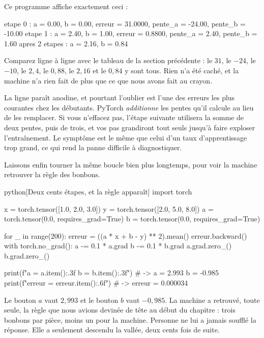 Ce programme affiche exactement ceci :

\begin{sortie}
etape 0 : a = 0.00, b = 0.00, erreur = 31.0000, pente_a = -24.00, pente_b = -10.00
etape 1 : a = 2.40, b = 1.00, erreur = 0.8800, pente_a = 2.40, pente_b = 1.60
apres 2 etapes : a = 2.16, b = 0.84
\end{sortie}

Comparez ligne à ligne avec le tableau de la section précédente : le $31$,
le $-24$, le $-10$, le $2{,}4$, le $0{,}88$, le $2{,}16$ et le $0{,}84$ y
sont tous. Rien n'a été caché, et la machine n'a rien fait de plus que ce
que nous avons fait au crayon.

\begin{piege}
La ligne  paraît anodine, et pourtant l'oublier
est l'une des erreurs les plus courantes chez les débutants. PyTorch
\emph{additionne} les pentes qu'il calcule au lieu de les remplacer. Si vous
n'effacez pas, l'étape suivante utilisera la somme de deux pentes, puis de
trois, et vos pas grandiront tout seuls jusqu'à faire exploser
l'entraînement. Le symptôme est le même que celui d'un taux d'apprentissage
trop grand, ce qui rend la panne difficile à diagnostiquer.
\end{piege}

Laissons enfin tourner la même boucle bien plus longtemps, pour voir la
machine retrouver la règle des bonbons.

\begin{code}{python}[Deux cents étapes, et la règle apparaît]
import torch

x = torch.tensor([1.0, 2.0, 3.0])
y = torch.tensor([2.0, 5.0, 8.0])
a = torch.tensor(0.0, requires_grad=True)
b = torch.tensor(0.0, requires_grad=True)

for _ in range(200):
    erreur = ((a * x + b - y) ** 2).mean()
    erreur.backward()
    with torch.no_grad():
        a -= 0.1 * a.grad
        b -= 0.1 * b.grad
    a.grad.zero_()
    b.grad.zero_()

print(f"a = {a.item():.3f}   b = {b.item():.3f}")   # -> a = 2.993   b = -0.985
print(f"erreur = {erreur.item():.6f}")              # -> erreur = 0.000034
\end{code}

Le bouton $a$ vaut $2{,}993$ et le bouton $b$ vaut $-0{,}985$. La machine a
retrouvé, toute seule, la règle que nous avions devinée de tête au début du
chapitre : trois bonbons par pièce, moins un pour la machine. Personne ne
lui a jamais soufflé la réponse. Elle a seulement descendu la vallée, deux
cents fois de suite.

